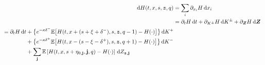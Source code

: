 \begin{align}
\d H (t,x,s,\bz,q) & = \sum\limits_i \partial_{x_i} H \dx_i \\
& = \partial_t H \dt + \partial_{K^{\pm}} H \d {K^{\pm}} + \partial_{\bZ} H \d {\bZ} \\
\begin{split}
& = \partial_t H \dt + \bigl\lbrace e^{ -\kappa \delta^{-}} \E \bigl[ H(t,x+(s+\xi+\delta^-),s,\bz,q-1) - H(\cdot) \bigr] \bigr\rbrace \d K^+\\
& \hphantom{{}={} \partial_t H \dt} + \bigl\lbrace e^{ -\kappa \delta^{+}} \E \bigl[ H(t,x-(s-\xi-\delta^+),s,\bz,q+1) - H(\cdot) \bigr] \bigr\rbrace \d K^-\\
& \hphantom{{}={} \partial_t H \dt} + \sum_{\bj} \E \left[ H(t,x,s+\eta_{0,\bj},\bj,q) - H(\cdot) \right] \d Z_{\bz,\bj}
\end{split}
\end{align}

